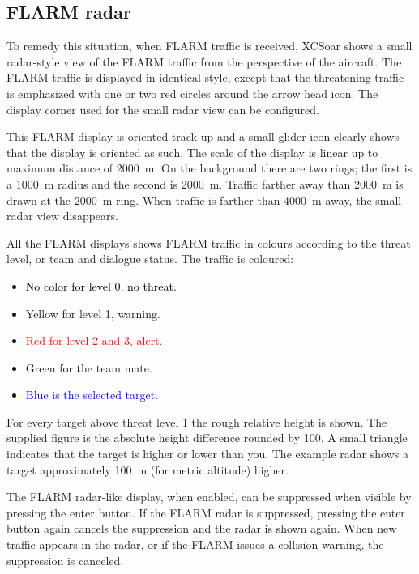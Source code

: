 \subsection*{FLARM radar}

To remedy this situation, when FLARM traffic is received, XCSoar shows a 
small radar-style view of the FLARM
traffic from the perspective of the aircraft.  The FLARM traffic is
displayed in identical style, except that the threatening traffic is emphasized 
with one or two red circles around the arrow head icon.  The display corner used 
for the small radar view can be configured.

This FLARM display is oriented track-up and a small glider icon
clearly shows that the display is oriented as such.  The scale of the
display is linear up to maximum distance of 2000~m.  On the
background there are two rings; the first is a 1000~m radius and the second
is 2000~m.  Traffic farther away than 2000~m is drawn at the 2000~m ring.
When traffic is farther than 4000~m away, the small radar view disappears.

All the FLARM displays shows FLARM traffic in colours according to
the threat level, or team and dialogue status.  The traffic is coloured:
\begin{itemize}
\item \textcolor{black} {No color for level 0, no threat.} 
\item \textcolor{warning} { Yellow for level 1, warning.}
\item \textcolor{red} {Red for level 2 and 3, alert.}
\item \textcolor{teammate} {Green for the team mate.}
\item \textcolor{blue} {Blue is the selected target.}
\end{itemize}

For every target above threat level 1 the rough relative height is shown. The
supplied figure is the absolute height difference rounded by 100.  A small
triangle indicates that the target is higher or lower than you.  The example
radar shows a target approximately 100~m (for metric altitude) higher.

The FLARM radar-like display, when enabled, can be suppressed when
visible by pressing the enter button.  If the
FLARM radar is suppressed, pressing the enter button again cancels the
suppression and the radar is shown again.  When new traffic appears in
the radar, or if the FLARM issues a collision warning, the suppression
is canceled.


